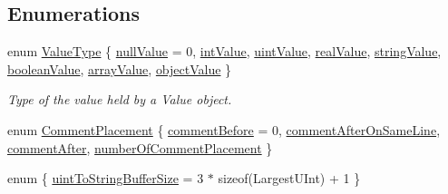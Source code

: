 \subsection*{Enumerations}
\begin{DoxyCompactItemize}
\item 
enum \hyperlink{namespace_json_a7d654b75c16a57007925868e38212b4e}{Value\+Type} \{ \newline
\hyperlink{namespace_json_a7d654b75c16a57007925868e38212b4ea7d9899633b4409bd3fc107e6737f8391}{null\+Value} = 0, 
\hyperlink{namespace_json_a7d654b75c16a57007925868e38212b4eae5a9d708d5c9e23ae9bf98898522512d}{int\+Value}, 
\hyperlink{namespace_json_a7d654b75c16a57007925868e38212b4eaea788d9a3bb00adc6d68d97d43e1ccd3}{uint\+Value}, 
\hyperlink{namespace_json_a7d654b75c16a57007925868e38212b4eab837c7b869c14d8be712deb45c9e490e}{real\+Value}, 
\newline
\hyperlink{namespace_json_a7d654b75c16a57007925868e38212b4ea804ef857affea2d415843c73f261c258}{string\+Value}, 
\hyperlink{namespace_json_a7d654b75c16a57007925868e38212b4ea14c30dbf4da86f7b809be299f671f7fd}{boolean\+Value}, 
\hyperlink{namespace_json_a7d654b75c16a57007925868e38212b4eadc8f264f36b55b063c78126b335415f4}{array\+Value}, 
\hyperlink{namespace_json_a7d654b75c16a57007925868e38212b4eae8386dcfc36d1ae897745f7b4f77a1f6}{object\+Value}
 \}\begin{DoxyCompactList}\small\item\em Type of the value held by a Value object. \end{DoxyCompactList}
\item 
enum \hyperlink{namespace_json_a4fc417c23905b2ae9e2c47d197a45351}{Comment\+Placement} \{ \hyperlink{namespace_json_a4fc417c23905b2ae9e2c47d197a45351a52f1733775460517b2ea6bedf4906d52}{comment\+Before} = 0, 
\hyperlink{namespace_json_a4fc417c23905b2ae9e2c47d197a45351a008a230a0586de54f30b76afe70fdcfa}{comment\+After\+On\+Same\+Line}, 
\hyperlink{namespace_json_a4fc417c23905b2ae9e2c47d197a45351ac5784ca53b12250888ddb642b06aebef}{comment\+After}, 
\hyperlink{namespace_json_a4fc417c23905b2ae9e2c47d197a45351abcbd3eb00417335e094e4a03379659b5}{number\+Of\+Comment\+Placement}
 \}
\item 
enum \{ \hyperlink{namespace_json_a2aacab54ef6fc18e833fbd4982a0a23aae4f2008c7919f20d81286121d1374424}{uint\+To\+String\+Buffer\+Size} = 3 $\ast$ sizeof(Largest\+U\+Int) + 1
 \}
\end{DoxyCompactItemize}
